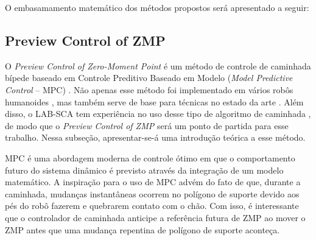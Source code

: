 O embasamamento matemático dos métodos propostos será apresentado a seguir:


\subsection{Preview Control of ZMP}

O \emph{Preview Control of Zero-Moment Point} é um método de controle de caminhada bípede baseado em Controle Preditivo Baseado em Modelo (\emph{Model Predictive Control} -- MPC) \cite{kajita2003}. Não apenas esse método foi implementado em vários robôs humanoides \cite{yi2016}, mas  também serve de base para técnicas no estado da arte \cite{tesemarcos,herdt2010}. Além disso, o LAB-SCA tem experiência no uso desse tipo de algoritmo de caminhada \cite{max22,tesemarcos}, de modo que o \emph{Preview Control of ZMP} será um ponto de partida para esse trabalho. Nessa subseção, apresentar-se-á uma introdução teórica a esse método.

MPC é uma abordagem moderna de controle ótimo em que o comportamento futuro do sistema dinâmico é previsto através da integração de um modelo matemático. A inspiração para o uso de MPC advém do fato de que, durante a caminhada, mudanças instantâneas ocorrem no polígono de suporte devido aos pés do robô fazerem e quebrarem contato com o chão. Com isso, é interessante que o controlador de caminhada anticipe a referência futura de ZMP ao mover o ZMP antes que uma mudança repentina de polígono de suporte aconteça.

